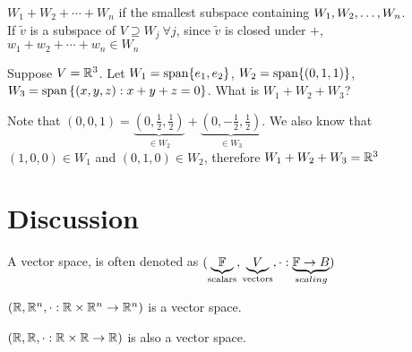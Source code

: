 \begin{remark}
    $W_1 + W_2 + \cdots + W_n$ if the smallest subspace containing ${W}_1,{W}_2, \ldots, {W}_{n}$. \\
    If $\tilde  v$ is a subspace of $V \supseteq W_j \ \forall j$, since $\tilde  v$ is closed under $+$, $w_1 + w_2 + \cdots + w_n \in W_n$
\end{remark}
\begin{example}
Suppose $V = \mathbb R^3$. Let $W_1 = \text{span} \{e_1, e_2\}$, $W_2 = \text{span} \{(0,1,1)\}$, $W_3 = \text{span} \left\{ (x,y,z) : x + y + z = 0 \right\}$. 
What is $W_1 + W_2 + W_3$?
\end{example}
Note that $(0,0,1) = \underbrace{\left(0,\frac12,\frac12\right)}_{\in W_2} +  \underbrace{\left(0,-\frac12,\frac12\right)}_{\in W_3}$. We also know that $(1,0,0) \in W_1$ and $(0,1,0) \in W_2$, therefore $W_1 + W_2 + W_3 = \mathbb R^3$ \\
\section*{Discussion}
\begin{definition}
    A vector space, is often denoted as $(\underbrace{\mathbb F}_{\text{scalars}}, \underbrace{V}_{\text{vectors}}, \cdot : \underbrace{\mathbb F \to B}_{scaling})$
\end{definition}
\begin{example}
    $(\mathbb R,\mathbb R^n, \cdot : \mathbb R \times \mathbb R^n \to \mathbb R^n)$ is a vector space.
\end{example}
\begin{example}
    $(\mathbb R, \mathbb R, \cdot : \mathbb R \times \mathbb R \to \mathbb R)$ is also a vector space.
\end{example}
